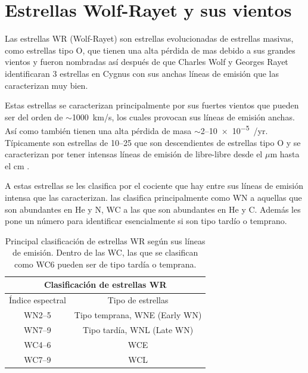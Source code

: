\documentclass{book}
\begin{document}
\section{Estrellas Wolf-Rayet y sus vientos}

Las estrellas WR (Wolf-Rayet) son estrellas evolucionadas de estrellas masivas, como estrellas tipo O, que tienen una alta pérdida de mas debido a sus grandes vientos y fueron nombradas así después de que Charles Wolf y Georges Rayet identificaran 3 estrellas en Cygnus con sus  anchas líneas de emisión que las caracterizan muy bien. 

Estas estrellas se caracterizan principalmente por sus fuertes vientos que pueden ser del orden de $\sim$\SI{1000}{km/s}, los cuales provocan sus líneas de emisión anchas. Así como también tienen una alta pérdida de masa $\sim$2--\SI{10e-5}{\msun/yr}. Típicamente son estrellas de 10--\SI{25}{\msun} que son descendientes de estrellas tipo O y se caracterizan por tener intensas líneas de emisión de libre-libre desde el $\mu$m hasta el cm \citep{crowther:2007}.

A estas estrellas se les clasifica por el cociente que hay entre sus líneas de emisión intensa que las caracterizan. \cite{Smith:1968} las clasifica principalmente como WN a aquellas que son abundantes en He y N, WC a las que son abundantes en He y C. Además les pone un número para identificar esencialmente si son tipo tardío o temprano.

\begin{table}[h]
    \begin{center}
        \begin{tabular}{c c}
        \toprule
        \multicolumn{2}{c}{Clasificación de estrellas WR} \\ \midrule
        Índice espectral    & Tipo de estrellas\\ \midrule
        WN2--5     & Tipo temprana, WNE (Early WN)\\
        WN7--9 & Tipo tardía, WNL (Late WN) \\
        WC4--6 & WCE\\
        WC7--9 & WCL \\ \bottomrule
        \end{tabular}
    \caption{Principal clasificación de estrellas WR  según sus líneas de emisión. Dentro de las WC, las que se clasifican como WC6 pueden ser de tipo tardía o temprana.}
    \label{tab:WR-clasificacion}
    \end{center}
\end{table}
\end{document}
